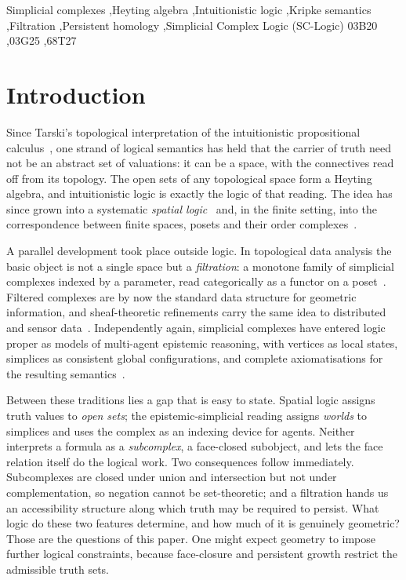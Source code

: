 \documentclass[final,12pt]{elsarticle}
\theoremstyle{plain}
\theoremstyle{definition}
\begin{document}
\begin{frontmatter}
\begin{keyword}
Simplicial complexes \sep Heyting algebra \sep Intuitionistic logic \sep Kripke semantics \sep Filtration \sep Persistent homology \sep Simplicial Complex Logic (SC-Logic)
\MSC 03B20 \sep 03G25 \sep 68T27
\end{keyword}
\end{frontmatter}
\section{Introduction}
\label{sec:intro}

Since Tarski's topological interpretation of the intuitionistic propositional
calculus~\cite{tarski1938,mckinseytarski1944}, one strand of logical semantics
has held that the carrier of truth need not be an abstract set of valuations:
it can be a space, with the connectives read off from its topology. The open
sets of any topological space form a Heyting algebra, and intuitionistic logic
is exactly the logic of that reading. The idea has since grown into a
systematic \emph{spatial logic}~\cite{aiello2003,handbookspatial} and, in the
finite setting, into the correspondence between finite spaces, posets and their
order complexes~\cite{mccord1966,barmak2011}.

A parallel development took place outside logic. In topological data analysis
the basic object is not a single space but a \emph{filtration}: a monotone
family of simplicial complexes indexed by a parameter, read categorically as a
functor on a poset~\cite{bubenikscott2014,chazal2016}. Filtered complexes are
by now the standard data structure for geometric information, and
sheaf-theoretic refinements carry the same idea to distributed and sensor
data~\cite{curry2014}. Independently again, simplicial complexes have entered
logic proper as models of multi-agent epistemic reasoning, with vertices as
local states, simplices as consistent global configurations, and complete
axiomatisations for the resulting
semantics~\cite{goubault2021,vanditmarsch2024}.

Between these traditions lies a gap that is easy to state. Spatial logic
assigns truth values to \emph{open sets}; the epistemic-simplicial reading
assigns \emph{worlds} to simplices and uses the complex as an indexing device
for agents. Neither interprets a formula as a \emph{subcomplex}, a face-closed
subobject, and lets the face relation itself do the logical work. Two
consequences follow immediately. Subcomplexes are closed under union and
intersection but not under complementation, so negation cannot be
set-theoretic; and a filtration hands us an accessibility structure along
which truth may be required to persist. What logic do these two features
determine, and how much of it is genuinely geometric? Those are the questions
of this paper. One might expect geometry to impose further logical constraints,
because face-closure and persistent growth restrict the admissible truth sets.
\end{document}
